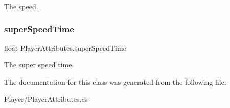 The speed. 

\mbox{\label{class_player_attributes_a8d65a1b221e07cde721025345011066f}} 
\subsubsection{\texorpdfstring{super\+Speed\+Time}{superSpeedTime}}
{\footnotesize\ttfamily float Player\+Attributes.\+super\+Speed\+Time}



The super speed time. 



The documentation for this class was generated from the following file\+:\begin{DoxyCompactItemize}
\item 
Player/Player\+Attributes.\+cs\end{DoxyCompactItemize}
